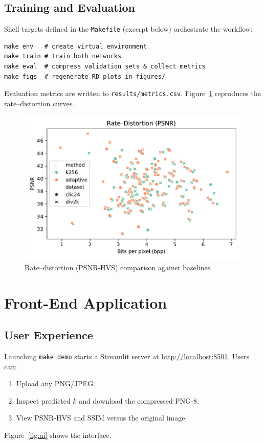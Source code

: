 \documentclass[11pt]{article}
\begin{document}
\subsection{Training and Evaluation}
Shell targets defined in the \texttt{Makefile} (excerpt below) orchestrate the workflow:
\begin{verbatim}
make env   # create virtual environment
make train # train both networks
make eval  # compress validation sets & collect metrics
make figs  # regenerate RD plots in figures/
\end{verbatim}

Evaluation metrics are written to \texttt{results/metrics.csv}. Figure~\ref{fig:rd-psnr} reproduces the rate–distortion curves.

\begin{figure}[H]
  \centering
  \includegraphics[width=0.7\linewidth]{figures/rd_psnr.pdf}
  \caption{Rate–distortion (PSNR-HVS) comparison against baselines.}
  \label{fig:rd-psnr}
\end{figure}

\section{Front-End Application}
\subsection{User Experience}
Launching \texttt{make demo} starts a Streamlit server at \url{http://localhost:8501}. Users can:
\begin{enumerate}
  \item Upload any PNG/JPEG.
  \item Inspect predicted $k$ and download the compressed PNG-8.
  \item View PSNR-HVS and SSIM versus the original image.
\end{enumerate}
Figure~\ref{fig:ui} shows the interface.
\end{document}
